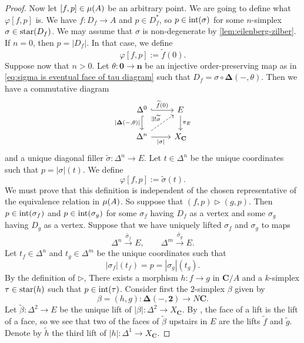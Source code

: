 \begin{proof}
Now let $[f,p] \in \operatorname{\mu}(A)$ be an arbitrary point. We are going to define what $\varphi[f,p]$ is. We have $f : D_f \to A$ and $p \in D_f^*$, so $p \in \operatorname{int}(\sigma)$ for some $n$-simplex $\sigma \in \operatorname{star}(D_f)$. We may assume that $\sigma$ is non-degenerate by \cref{lem:eilenberg-zilber}.
If $n=0$, then $p=|D_f|$. In that case, we define
\[ \varphi[f,p] := \widetilde{f}(0). \]
Suppose now that $n>0$. Let $\theta : \mathbf{0} \to \mathbf{n}$ be an injective order-preserving map as in \cref{eq:sigma is eventual face of tau diagram} such that $D_f = \sigma \circ \mathbf{\Delta}(-,\theta)$. Then we have a commutative diagram
\[ \begin{tikzcd}
\Delta^0 \arrow[hook]{r}{\widetilde{f}(0)} \arrow[hook, swap]{d}{|\mathbf{\Delta}(-,\theta)|} & E \arrow{d}{\pi_E} \\
\Delta^n \arrow[swap]{r}{|\sigma|} \arrow[dashed]{ur}{\exists ! \widetilde{\sigma}} & X_{\mathbf{C}} \end{tikzcd} \]
and a unique diagonal filler $\widetilde{\sigma} : \Delta^n \to E$.  
Let $t \in \Delta^n$ be the unique coordinates such that $p = |\sigma|(t)$. We define
\[ \varphi[f,p] := \widetilde{\sigma}(t). \]
We must prove that this definition is independent of the chosen representative of the equivalence relation in $\operatorname{\mu}(A)$. 
So suppose that $(f,p) \rhd (g,p)$. Then $p \in \operatorname{int}(\sigma_f)$ and $p \in \operatorname{int}(\sigma_g)$ for some $\sigma_f$ having $D_f$ as a vertex and some $\sigma_g$ having $D_g$ as a vertex. Suppose that we have uniquely lifted $\sigma_f$ and $\sigma_g$ to maps
\[ \Delta^n \xrightarrow{\widetilde{\sigma_f}} E, \qquad \Delta^m \xrightarrow{\widetilde{\sigma_g}} E. \]
Let $t_f \in \Delta^n$ and $t_g \in \Delta^m$ be the unique coordinates such that
\[ |\sigma_f|(t_f) = p = |\sigma_g|(t_g). \]
By the definition of $\rhd$, There exists a morphism $h : f \to g$ in $\mathbf{C}/A$ and a $k$-simplex $\tau \in \operatorname{star}(h)$ such that $p \in \operatorname{int}(\tau)$. Consider first the $2$-simplex $\beta$ given by
\[ \beta = (h,g) : \mathbf{\Delta}(-, \mathbf{2}) \to N\mathbf{C}. \]
Let $\widetilde{\beta} : \Delta^2 \to E$ be the unique lift of $|\beta| : \Delta^2 \to X_{\mathbf{C}}$. By \cite[Exercise A.1]{AlgebraicTopologyBible}, the face of a lift is the lift of a face, so we see that two of the faces of $\widetilde{\beta}$ upstairs in $E$ are the lifts $\widetilde{f}$ and $\widetilde{g}$. Denote by $\widetilde{h}$ the third lift of $|h| : \Delta^1 \to X_{\mathbf{C}}$.


\end{proof}
